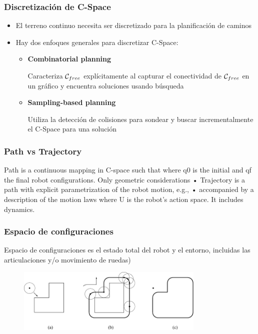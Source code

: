 \begin{frame}
    \frametitle{Discretización de C-Space}
    
    \begin{itemize}
    \item El terreno continuo necesita ser discretizado para la planificación de caminos
    \item Hay dos enfoques generales para discretizar C-Space:
        \begin{itemize}
        \item {\bf Combinatorial planning}
        
        Caracteriza $\mathcal{C}_{free}$ explícitamente al capturar el conectividad de $\mathcal{C}_{free}$ en un gráfico y encuentra soluciones usando búsqueda
        
        \item {\bf Sampling-based planning}
        
            Utiliza la detección de colisiones para sondear y buscar incrementalmente el C-Space para una solución
        \end{itemize}
    \end{itemize}

    
\end{frame}


\begin{frame}
    \frametitle{Path vs Trajectory}
    
    Path is a continuous mapping in C-space such that
where q0 is the initial and qf the final robot configurations.
Only geometric considerations
• Trajectory is a path with explicit parametrization of the robot
motion, e.g.,
• accompanied by a description of the motion laws
where U is the robot’s action space.
It includes dynamics.
\end{frame}

\begin{frame}
	\frametitle{Espacio de configuraciones}

	Espacio de configuraciones es el estado total del robot y el entorno, incluidas las articulaciones y/o movimiento de ruedas)
	
	\begin{figure}[!h]
		\includegraphics[width=0.8\textwidth]{images/configuration_space_obstacle.pdf}
	\end{figure}
	
\end{frame}

